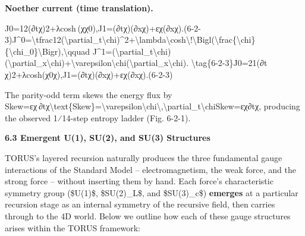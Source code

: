 \documentclass[]{article}
\begin{document}
\textbf{Noether current (time translation).}

J0=12(∂tχ)2+λcosh⁡ ⁣(χχ0),J1=(∂tχ)(∂xχ)+εχ(∂xχ).(6-2-3)J\^{}0=\textbackslash{}tfrac12(\textbackslash{}partial\_t\textbackslash{}chi)\^{}2+\textbackslash{}lambda\textbackslash{}cosh\textbackslash{}!\textbackslash{}Bigl(\textbackslash{}frac\{\textbackslash{}chi\}\{\textbackslash{}chi\_0\}\textbackslash{}Bigr),\textbackslash{}qquad
J\^{}1=(\textbackslash{}partial\_t\textbackslash{}chi)(\textbackslash{}partial\_x\textbackslash{}chi)+\textbackslash{}varepsilon\textbackslash{}chi(\textbackslash{}partial\_x\textbackslash{}chi).
\textbackslash{}tag\{6-2-3\}J0=21​(∂t​χ)2+λcosh(χ0​χ​),J1=(∂t​χ)(∂x​χ)+εχ(∂x​χ).(6-2-3)

The parity-odd term skews the energy flux by\\
Skew=εχ ∂tχ\textbackslash{}text\{Skew\}=\textbackslash{}varepsilon\textbackslash{}chi\textbackslash{},\textbackslash{}partial\_t\textbackslash{}chiSkew=εχ∂t​χ,
producing the observed 1⁄14-step entropy ladder (Fig. 6-2-1).

\textbf{6.3 Emergent U(1), SU(2), and SU(3) Structures}

TORUS's layered recursion naturally produces the three fundamental gauge
interactions of the Standard Model -- electromagnetism, the weak force,
and the strong force -- without inserting them by hand. Each force's
characteristic symmetry group (\$U(1)\$, \$SU(2)\_L\$, and \$SU(3)\_c\$)
\textbf{emerges} at a particular recursion stage as an internal symmetry
of the recursive field, then carries through to the 4D world. Below we
outline how each of these gauge structures arises within the TORUS
framework:
\end{document}
